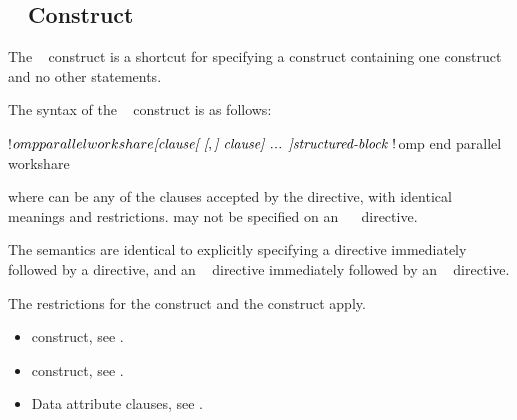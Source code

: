 \begin{fortranspecific}
\vspace{-5ex}
\subsection{~ Construct}
\label{subsec:parallel workshare Construct}
\summary
The ~ construct is a shortcut for specifying a 
construct containing one  construct and no other statements.

\syntax
The syntax of the ~ construct is as follows:

\begin{ompfPragma}
!$omp parallel workshare \plc{[clause[ [},\plc{] clause] ... ]}
   \plc{structured-block }
!$omp end parallel workshare
\end{ompfPragma}

where  can be any of the clauses accepted by the  directive, with
identical meanings and restrictions.  may not be specified on an
~~ directive.

\descr
The semantics are identical to explicitly specifying a  directive immediately
followed by a  directive, and an ~ directive immediately
followed by an ~ directive.

\restrictions
The restrictions for the  construct and the  construct apply.

\crossreferences
\begin{itemize}
\item {} construct, see
.

\item {} construct, see
.

\item Data attribute clauses, see
.
\end{itemize}
\end{fortranspecific}










